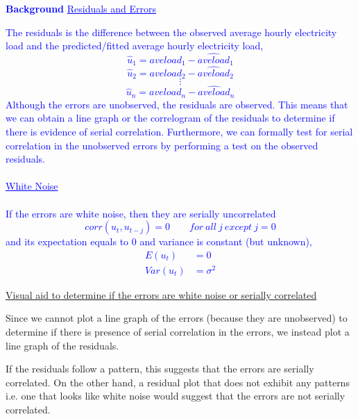 \documentclass[12pt]{report}
\newenvironment{blueframed}[1][blue]
{\def\FrameCommand{\fboxsep=\FrameSep\fcolorbox{#1}{white}}%
\MakeFramed {\advance\hsize-\width \FrameRestore}}
{\endMakeFramed}
\begin{document}
\justify
\begin{blueframed}
	\textcolor{blue}{\textbf{Background}}
	\vspace{-\baselineskip}
	\justify
	\textcolor{blue}{\underline{Residuals and Errors}}
	
	\noindent \textcolor{blue}
	{
		The residuals is the difference between the observed average hourly electricity load and the predicted/fitted average hourly electricity load, 
		$$\hat{u}_1 = aveload_1 - \widehat{aveload}_1$$
		$$\hat{u}_2 = aveload_2 - \widehat{aveload}_2$$
		$$\vdots$$
		$$\hat{u}_n = aveload_n - \widehat{aveload}_n$$
		\noindent Although the errors are unobserved, the residuals are observed. This means that we can obtain a line graph or the correlogram of the residuals to determine if there is evidence of serial correlation. Furthermore, we can formally test for serial correlation in the unobserved errors by performing a test on the observed residuals. \\ \\ \uline{White Noise} \\ \\
		If the errors are white noise, then they are serially uncorrelated $$corr({u}_t, {u}_{t-j}) = 0 \qquad for\ all\ j\ except\ j=0$$ and its expectation equals to 0 and variance is constant (but unknown), \begin{align*}
			E({u}_t) &= 0 \\
			Var({u}_t) &= \sigma^2
		\end{align*} \vspace{-\baselineskip}
	}
\end{blueframed}

\noindent \uline{Visual aid to determine if the errors are white noise or serially correlated}

\noindent Since we cannot plot a line graph of the errors (because they are unobserved) to determine if there is presence of serial correlation in the errors, we instead plot a line graph of the residuals.

\noindent If the residuals follow a pattern, this suggests that the errors are serially correlated. On the other hand, a residual plot that does not exhibit any patterns i.e. one that looks like white noise would suggest that the errors are not serially correlated.
\end{document}
